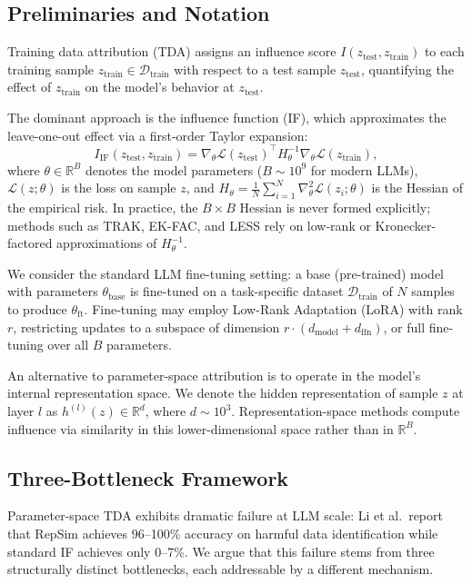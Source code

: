 \documentclass{article}
\begin{document}
\subsection{Preliminaries and Notation}

Training data attribution (TDA) assigns an influence score $I(z_\text{test}, z_\text{train})$ to each training sample $z_\text{train} \in \mathcal{D}_\text{train}$ with respect to a test sample $z_\text{test}$, quantifying the effect of $z_\text{train}$ on the model's behavior at $z_\text{test}$.

The dominant approach is the influence function (IF), which approximates the leave-one-out effect via a first-order Taylor expansion:
\begin{equation}
I_\text{IF}(z_\text{test}, z_\text{train}) = \nabla_\theta \mathcal{L}(z_\text{test})^\top H_\theta^{-1} \nabla_\theta \mathcal{L}(z_\text{train}),
\label{eq:if}
\end{equation}
where $\theta \in \mathbb{R}^B$ denotes the model parameters ($B \sim 10^9$ for modern LLMs), $\mathcal{L}(z; \theta)$ is the loss on sample $z$, and $H_\theta = \frac{1}{N} \sum_{i=1}^{N} \nabla_\theta^2 \mathcal{L}(z_i; \theta)$ is the Hessian of the empirical risk. In practice, the $B \times B$ Hessian is never formed explicitly; methods such as TRAK, EK-FAC, and LESS rely on low-rank or Kronecker-factored approximations of $H_\theta^{-1}$.

We consider the standard LLM fine-tuning setting: a base (pre-trained) model with parameters $\theta_\text{base}$ is fine-tuned on a task-specific dataset $\mathcal{D}_\text{train}$ of $N$ samples to produce $\theta_\text{ft}$. Fine-tuning may employ Low-Rank Adaptation (LoRA) with rank $r$, restricting updates to a subspace of dimension $r \cdot (d_\text{model} + d_\text{ffn})$, or full fine-tuning over all $B$ parameters.

An alternative to parameter-space attribution is to operate in the model's internal representation space. We denote the hidden representation of sample $z$ at layer $l$ as $h^{(l)}(z) \in \mathbb{R}^d$, where $d \sim 10^3$. Representation-space methods compute influence via similarity in this lower-dimensional space rather than in $\mathbb{R}^B$.

\subsection{Three-Bottleneck Framework}

Parameter-space TDA exhibits dramatic failure at LLM scale: Li et al.\ report that RepSim achieves 96--100\% accuracy on harmful data identification while standard IF achieves only 0--7\%. We argue that this failure stems from three structurally distinct bottlenecks, each addressable by a different mechanism.
\end{document}
